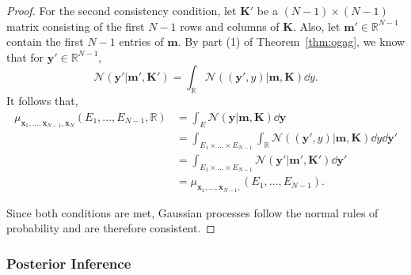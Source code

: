 \begin{proof}
    For the second consistency condition, let $\mathbf{K}'$ be a $(N - 1) \times (N - 1)$ matrix consisting of the first $N - 1$ rows and columns of $\mathbf{K}$.
    Also, let $\mathbf{m}' \in \mathbb{R}^{N - 1}$ contain the first $N - 1$ entries of $\mathbf{m}$.
    By part (1) of Theorem~\ref{thm:ogag}, we know that for $\mathbf{y}' \in \mathbb{R}^{N - 1}$,
    \begin{equation*}
        \mathcal{N}(\mathbf{y}' | \mathbf{m}', \mathbf{K}')
        = \int_{\mathbb{R}} \mathcal{N}((\mathbf{y}', y) | \mathbf{m}, \mathbf{K}) \dd y.
    \end{equation*}
    It follows that,
    \begin{align*}
        \mu_{\mathbf{x}_1, \dots, \mathbf{x}_{N - 1}, \mathbf{x}_N}(E_1, \dots, E_{N - 1}, \mathbb{R})
        & = \int_{E} \mathcal{N}( \mathbf{y} | \mathbf{m}, \mathbf{K}) \dd \mathbf{y} \\
        & = \int_{E_1 \times \dots \times E_{N - 1}}
        \int_{\mathbb{R}}
        \mathcal{N}( (\mathbf{y}', y) | \mathbf{m}, \mathbf{K})
        \dd y
        \dd \mathbf{y}' \\
        & = \int_{E_1 \times \dots \times E_{N - 1}}
        \mathcal{N}( \mathbf{y}' | \mathbf{m}', \mathbf{K}')
        \dd \mathbf{y}' \\
        & = \mu_{\mathbf{x}_1, \dots, \mathbf{x}_{N - 1}, }(E_1, \dots, E_{N - 1}).
    \end{align*}

    Since both conditions are met, Gaussian processes follow the normal rules of probability and are therefore consistent.
\end{proof}

\subsubsection{Posterior Inference}\label{sssec:post-inf}

